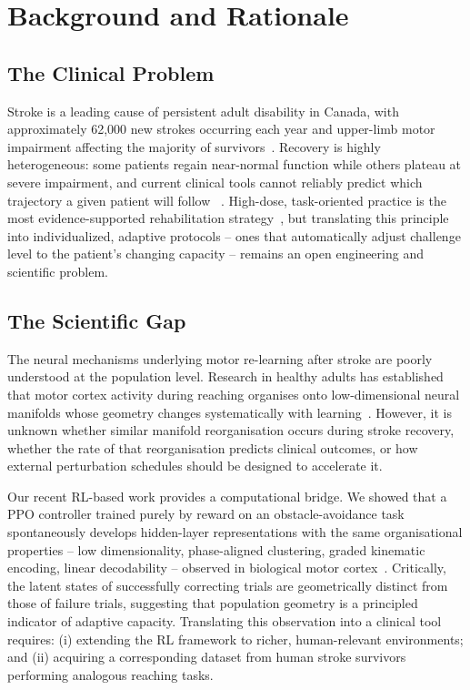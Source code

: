 \documentclass[12pt]{article}
\begin{document}
\section{Background and Rationale}

\subsection{The Clinical Problem}

Stroke is a leading cause of persistent adult disability in Canada, with
approximately 62,000 new strokes occurring each year and upper-limb
motor impairment affecting the majority of survivors~\cite{HeartStroke2023}.
Recovery is highly heterogeneous: some patients regain near-normal function
while others plateau at severe impairment, and current clinical tools cannot
reliably predict which trajectory a given patient will follow
~\cite{Kwakkel2019}.
High-dose, task-oriented practice is the most evidence-supported
rehabilitation strategy~\cite{French2016}, but translating this principle
into individualized, adaptive protocols -- ones that automatically adjust
challenge level to the patient's changing capacity -- remains an open
engineering and scientific problem.

\subsection{The Scientific Gap}

The neural mechanisms underlying motor re-learning after stroke are poorly
understood at the population level.
Research in healthy adults has established that motor cortex activity during
reaching organises onto low-dimensional neural manifolds whose geometry
changes systematically with learning~\cite{Churchland2012,Sadtler2014,Oby2019}.
However, it is unknown whether similar manifold reorganisation occurs during
stroke recovery, whether the rate of that reorganisation predicts clinical
outcomes, or how external perturbation schedules should be designed to
accelerate it.

Our recent RL-based work provides a computational bridge.
We showed that a PPO controller trained purely by reward on an
obstacle-avoidance task spontaneously develops hidden-layer representations
with the same organisational properties -- low dimensionality, phase-aligned
clustering, graded kinematic encoding, linear decodability -- observed in
biological motor cortex~\cite{Ohue2026}.
Critically, the latent states of successfully correcting trials are
geometrically distinct from those of failure trials, suggesting that
population geometry is a principled indicator of adaptive capacity.
Translating this observation into a clinical tool requires: (i) extending
the RL framework to richer, human-relevant environments; and (ii) acquiring
a corresponding dataset from human stroke survivors performing analogous
reaching tasks.
\end{document}

